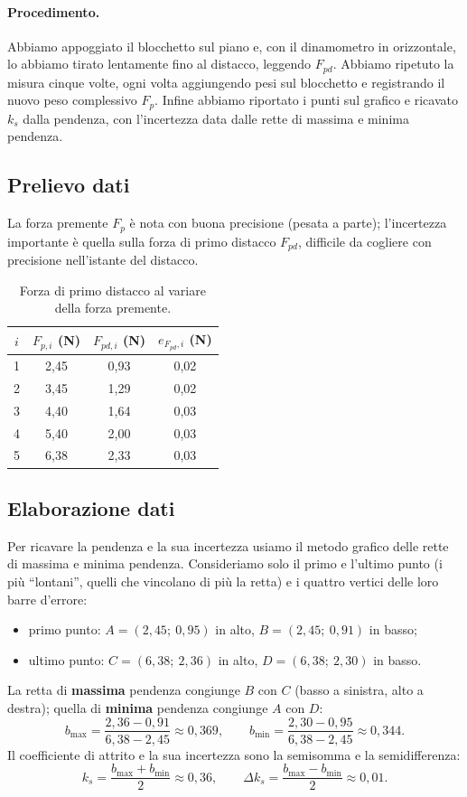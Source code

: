 \paragraph{Procedimento.} Abbiamo appoggiato il blocchetto sul piano e, con il dinamometro in orizzontale, lo abbiamo tirato lentamente fino al distacco, leggendo $F_{pd}$. Abbiamo ripetuto la misura cinque volte, ogni volta aggiungendo pesi sul blocchetto e registrando il nuovo peso complessivo $F_p$. Infine abbiamo riportato i punti sul grafico e ricavato $k_s$ dalla pendenza, con l'incertezza data dalle rette di massima e minima pendenza.

\subsection{Prelievo dati}
La forza premente $F_p$ è nota con buona precisione (pesata a parte); l'incertezza importante è quella sulla forza di primo distacco $F_{pd}$, difficile da cogliere con precisione nell'istante del distacco.

\begin{table}[!htbp]
\centering
\begin{tabular}{@{}cccc@{}}
\toprule
$i$ & $F_{p,i}$ (\si{\newton}) & $F_{pd,i}$ (\si{\newton}) & $e_{F_{pd},i}$ (\si{\newton}) \\
\midrule
1 & 2,45 & 0,93 & 0,02 \\
2 & 3,45 & 1,29 & 0,02 \\
3 & 4,40 & 1,64 & 0,03 \\
4 & 5,40 & 2,00 & 0,03 \\
5 & 6,38 & 2,33 & 0,03 \\
\bottomrule
\end{tabular}
\caption{Forza di primo distacco al variare della forza premente.}
\label{tab:attrito-relazione}
\end{table}

\subsection{Elaborazione dati}
Per ricavare la pendenza e la sua incertezza usiamo il metodo grafico delle rette di massima e minima pendenza. Consideriamo solo il primo e l'ultimo punto (i più ``lontani'', quelli che vincolano di più la retta) e i quattro vertici delle loro barre d'errore:
\begin{itemize}
    \item primo punto: $A=(2{,}45;\ 0{,}95)$ in alto, $B=(2{,}45;\ 0{,}91)$ in basso;
    \item ultimo punto: $C=(6{,}38;\ 2{,}36)$ in alto, $D=(6{,}38;\ 2{,}30)$ in basso.
\end{itemize}
La retta di \textbf{massima} pendenza congiunge $B$ con $C$ (basso a sinistra, alto a destra); quella di \textbf{minima} pendenza congiunge $A$ con $D$:
\[ b_{\max} = \frac{2{,}36 - 0{,}91}{6{,}38 - 2{,}45} \approx 0{,}369, \qquad
   b_{\min} = \frac{2{,}30 - 0{,}95}{6{,}38 - 2{,}45} \approx 0{,}344. \]
Il coefficiente di attrito e la sua incertezza sono la semisomma e la semidifferenza:
\[ k_s = \frac{b_{\max}+b_{\min}}{2} \approx 0{,}36, \qquad
   \Delta k_s = \frac{b_{\max}-b_{\min}}{2} \approx 0{,}01. \]

